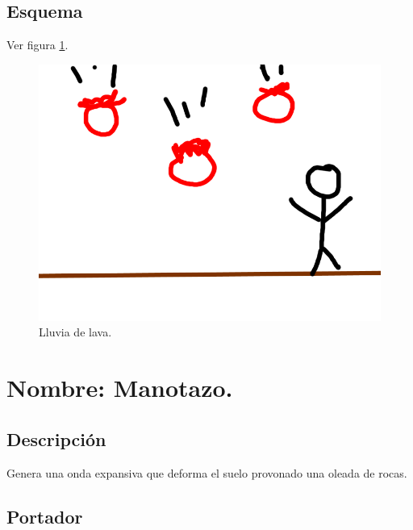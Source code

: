 \subsection{Esquema}	
			Ver figura \ref{fig:lluviaL}.
			\begin{figure}
				\centering
				\includegraphics[height=0.2 \textheight]{Imagenes/lluviaL}
				\caption{Lluvia de lava.}
				\label{fig:lluviaL}
			\end{figure}

\section{Nombre: Manotazo.} \label{hab.Manotazo}
\subsection{Descripción}
Genera una onda expansiva que deforma el suelo provonado una oleada de rocas.
\subsection{Portador}
